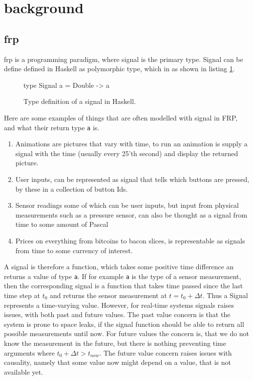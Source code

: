 \section{background}
\subsection{\acrlong{frp}}
\acrshort{frp} is a programming paradigm, where signal is the primary type. Signal can be define defined in Haskell as polymorphic type, which in as shown in listing \ref{lst:signalDef}. 
\begin{figure}
    \begin{hscode}
     type Signal a = Double -> a
    \end{hscode}
    \caption{Type definition of a signal in Haskell.}
    \label{lst:signalDef}
\end{figure}
Here are some examples of things that are often modelled with signal in FRP, and what their return type \verb|a| is.
\begin{enumerate}
    \item Animations are pictures that vary with time, to run an animation is supply a signal with the time (usually every 25'th second) and display the returned picture.
    \item User inputs, can be represented as signal that tells which buttons are pressed, by these in a collection of button Ids. 
    \item Sensor readings some of which can be user inputs, but input from physical measurements such as a pressure sensor, can also be thought as a signal from time to some amount of Pascal
    \item Prices on everything from bitcoins to bacon slices, is representable as signals from time to some currency of interest.
\end{enumerate}
A signal is therefore a function, which takes some positive time difference an returns a value of type \verb|a|. If for example \verb|a| is the type of a sensor measurement, then the corresponding signal is a function that takes time passed since the last time step at $t_0$ and returns the sensor measurement at $t = t_0 + \Delta t$.
Thus a Signal represents a time-varying value. However, for real-time systems signals raises issues, with both past and future values.
The past value concern is that the system is prone to space leaks, if the signal function should be able to return all possible measurements until now. 
For future values the concern is, that we do not know the measurement in the future, but there is nothing preventing time arguments where $t_0 + \Delta t > t_{now}$. The future value concern raises issues with causality, namely that some value now might depend on a value, that is not available yet.

